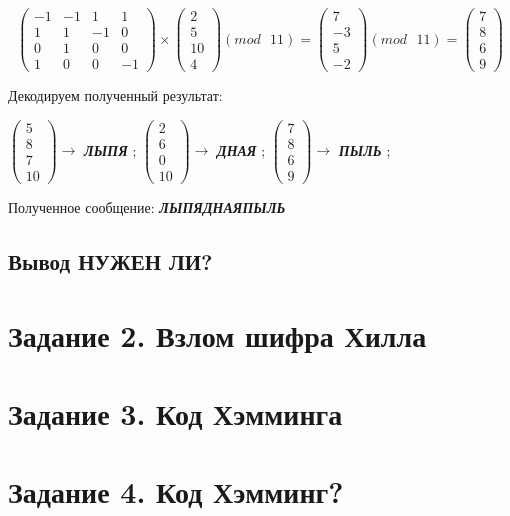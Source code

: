 \documentclass[a5paper, 10pt]{article}
\theoremstyle{definition}
\theoremstyle{plain}
\theoremstyle{remark}
\begin{document}
\begin{equation}
\begin{pmatrix}
-1 & -1 & 1 & 1\\
1 & 1 & -1 & 0 \\
0 & 1 & 0 & 0 \\
1 & 0 & 0 & -1
\end{pmatrix}
 \times
\begin{pmatrix}
2\\
5\\
10\\
4
\end{pmatrix}
(mod \text{ }11)
= 
\begin{pmatrix}
7\\
-3\\
5\\
-2
\end{pmatrix}
(mod \text{ }11)
= \begin{pmatrix}
7\\
8\\
6\\
9
\end{pmatrix}
\end{equation}

Декодируем полученный результат:
\begin{center}
 $ \begin{pmatrix}
5\\
8\\
7\\
10
\end{pmatrix} \to$ \textbf{\textit{ЛЫПЯ}} ;
 $ \begin{pmatrix}
2\\
6\\
0\\
10
\end{pmatrix} \to$ \textbf{\textit{ДНАЯ}} ;
 $ \begin{pmatrix}
7\\
8\\
6\\
9
\end{pmatrix} \to$ \textbf{\textit{ПЫЛЬ}} ;
\end{center}
Полученное сообщение:  \textbf{\textit{\colorbox{red! 50}{ЛЫПЯ}\colorbox{green! 50}{ДНАЯПЫЛЬ}}}\\
\subsection{Вывод НУЖЕН ЛИ?}


\section{Задание 2. Взлом шифра Хилла}	

\section{Задание 3. Код Хэмминга}

\section{Задание 4. Код Хэмминг?}
\end{document}
